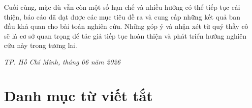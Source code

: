 Cuối cùng, mặc dù vẫn còn một số hạn chế và nhiều hướng có thể tiếp tục cải thiện, báo cáo đã đạt được các mục tiêu đề ra và cung cấp những kết quả ban đầu khả quan cho bài toán nghiên cứu. Những góp ý và nhận xét từ quý thầy cô sẽ là cơ sở quan trọng để tác giả tiếp tục hoàn thiện và phát triển hướng nghiên cứu này trong tương lai.

\vspace{2cm}
\begin{flushright}
\textit{TP. Hồ Chí Minh, tháng 06 năm 2026}\\[0.5cm]
\end{flushright}

\pagebreak

\tableofcontents
\pagebreak

\listoffigures
\pagebreak

\listoftables
\pagebreak

\chapter*{Danh mục từ viết tắt}

